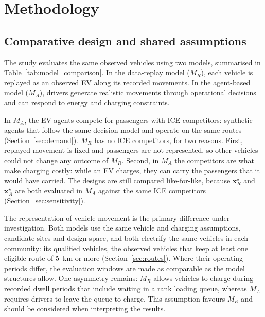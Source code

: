 \documentclass{elsarticle}
\newcommand{\MR}{\ensuremath{M_R}}
\newcommand{\MA}{\ensuremath{M_A}}
\newcommand{\xR}{\ensuremath{\mathbf{x}_R^{\star}}}
\newcommand{\xA}{\ensuremath{\mathbf{x}_A^{\star}}}
\begin{document}

\section{Methodology}
\label{sec:methodology}

\subsection{Comparative design and shared assumptions}
\label{sec:methodology_design}

The study evaluates the same observed vehicles using two models, summarised in Table~\ref{tab:model_comparison}. In the data-replay model (\(\MR\)), each vehicle is replayed as an observed EV along its recorded movements. In the agent-based model (\(\MA\)), drivers generate realistic movements through operational decisions and can respond to energy and charging constraints.

In \(\MA\), the EV agents compete for passengers with ICE competitors: synthetic agents that follow the same decision model and operate on the same routes (Section~\ref{sec:demand}). \(\MR\) has no ICE competitors, for two reasons. First, replayed movement is fixed and passengers are not represented, so other vehicles could not change any outcome of \(\MR\). Second, in \(\MA\) the competitors are what make charging costly: while an EV charges, they can carry the passengers that it would have carried. The designs are still compared like-for-like, because \(\xR\) and \(\xA\) are both evaluated in \(\MA\) against the same ICE competitors (Section~\ref{sec:sensitivity}).

The representation of vehicle movement is the primary difference under investigation. Both models use the same vehicle and charging assumptions, candidate sites and design space, and both electrify the same vehicles in each community: its qualified vehicles, the observed vehicles that keep at least one eligible route of 5~km or more (Section~\ref{sec:routes}). Where their operating periods differ, the evaluation windows are made as comparable as the model structures allow. One asymmetry remains: \(\MR\) allows vehicles to charge during recorded dwell periods that include waiting in a rank loading queue, whereas \(\MA\) requires drivers to leave the queue to charge. This assumption favours \(\MR\) and should be considered when interpreting the results.
\end{document}
